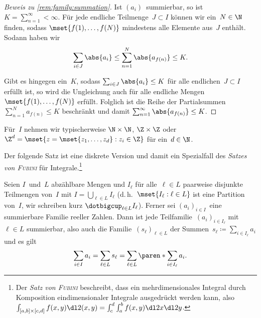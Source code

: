 \documentclass[a4paper]{article}
\begin{document}
\begin{proof}[Beweis zu \cref{rem:family:summation}]
    Ist $(a_i)$~summierbar, so ist $K = \sum_{n=1}^\infty < \infty$. Für jede endliche Teilmenge~$J \subset I$ können wir ein~$N \in \N$ finden, sodass $\mset{f(1),\dots,f(N)}$ mindestens alle Elemente aus~$J$ enthält. Sodann haben wir
    \begin{equation*}
        \sum_{i\in J} \abs{a_i} \leq \sum_{n=1}^N \abs{a_{f(n)}} \leq K.
    \end{equation*}

    Gibt es hingegen ein~$K$, sodass $\sum_{i\in J} \abs{a_i} \leq K$ für alle endlichen~$J \subset I$ erfüllt ist, so wird die Ungleichung auch für alle endliche Mengen $\mset{f(1),\dots,f(N)}$ erfüllt. Folglich ist die Reihe der Partialsummen $\sum_{n=1}^N a_{f(n)} \leq K$ beschränkt und damit $\sum_{n=1}^\infty \abs{a_{f(n)}} \leq K$.
\end{proof}

Für~$I$ nehmen wir typischerweise $\N \times \N$, $\Z \times \Z$ oder $\Z^d = \mset{z = \mset{z_1,\dots,z_d} : z_i \in \Z}$ für ein~$d \in \N$.

Der folgende Satz ist eine diskrete Version und damit ein Spezialfall des \emph{Satzes von \textsc{Fubini}} für Integrale.\footnote{Der \emph{Satz von \textsc{Fubini}} beschreibt, dass ein mehrdimensionales Integral durch Komposition eindimensionaler Integrale ausgedrückt werden kann, also $\int_{[a,b]\times[c,d]} f(x,y) \dl2(x,y) = \int_c^d \int_a^b f(x,y) \dl2x \dl2y$.}

\begin{theorem}\label{thm:family:rearrangement}
    Seien $I$~und~$L$ abzählbare Mengen und $I_\ell$ für alle~$\ell \in L$ paarweise disjunkte Teilmengen von~$I$ mit $I = \bigcup_{\ell\in L} I_\ell$ (d.\,h.\ $\mset{I_\ell : \ell \in L}$ ist eine Partition von~$I$, wir schreiben kurz $\dotbigcup_{\ell\in L} I_\ell$). Ferner sei $(a_i)_{i\in I}$~eine summierbare Familie reeller Zahlen. Dann ist jede Teilfamilie~$(a_i)_{i\in I_\ell}$ mit~$\ell \in L$ summierbar, also auch die Familie~$(s_\ell)_{\ell\in L}$ der Summen~$s_\ell \coloneqq \sum_{i\in I_\ell} a_i$ und es gilt
    \begin{equation*}
        \sum_{i\in I} a_i = \sum_{\ell\in L} s_\ell = \sum_{\ell\in L} \paren*{\sum_{i\in I_\ell} a_i}.
    \end{equation*}
\end{theorem}
\end{document}
